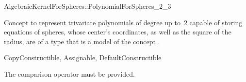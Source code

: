 \begin{ccRefConcept}{AlgebraicKernelForSpheres::PolynomialForSpheres_2_3}

\ccDefinition

Concept to represent
trivariate polynomials of degree up to~2 capable of storing equations
of spheres, whose center's coordinates, as well as the square of the radius, 
are of a type that is a model of the concept
.

\ccRefines
CopyConstructible, Assignable, DefaultConstructible

\ccCreation
{}




\ccOperations

The comparison operator \ccc{==} must be provided. 


\ccHasModels


\ccSeeAlso


\end{ccRefConcept}

